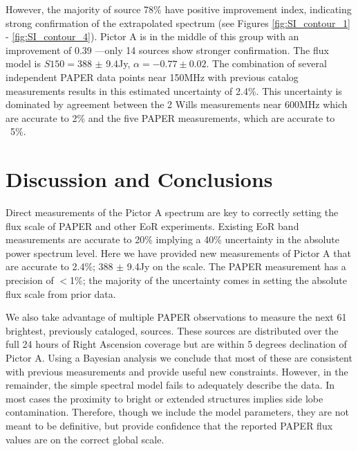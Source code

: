 \documentclass[preprint]{aastex}
\begin{document}
However, the majority of source 78\% have positive improvement index,
indicating strong confirmation of the extrapolated spectrum (see Figures
\ref{fig:SI_contour_1} - \ref{fig:SI_contour_4}).  Pictor A is in the middle of
this group  with an improvement of 0.39 ---only 14 sources show stronger
confirmation.  The flux model is $S150=$388 $\pm$ 9.4Jy, $\alpha=-0.77\pm0.02$.
The combination of several independent PAPER data points near 150MHz with
previous catalog measurements results in this estimated uncertainty of 2.4\%.
This uncertainty is dominated by agreement between the 2 Wills measurements
near 600MHz which are accurate to 2\% and the five PAPER measurements, which
are accurate to ~5\%.


 \section{Discussion and Conclusions}
 \label{sec:Conclusion}
 
Direct measurements of the Pictor A spectrum are key to correctly setting the
flux scale of PAPER and other EoR experiments. Existing EoR band measurements
are accurate to 20\% implying a 40\% uncertainty in the absolute power spectrum
level.  Here we have provided new measurements of Pictor A that are accurate to
2.4\%;  388 $\pm$ 9.4Jy on the \citet{Baars:1977p9678} scale. The PAPER
measurement has a precision of $<$1\%; the majority of the uncertainty comes in
setting the absolute flux scale from prior data.  

We also take advantage of multiple PAPER observations to measure the next  61
brightest, previously cataloged, sources. These sources are distributed over
the full 24 hours of Right Ascension coverage but are within 5 degrees
declination of Pictor A.  Using a Bayesian analysis we conclude that most of
these are consistent with previous measurements and provide useful new
constraints. However, in the remainder, the simple spectral model fails to
adequately describe the data. In most cases the proximity to bright or extended
structures implies side lobe contamination.  Therefore, though we include the
model parameters, they are not meant to be definitive, but provide confidence
that the reported PAPER flux values are on the correct global scale.
\end{document}
